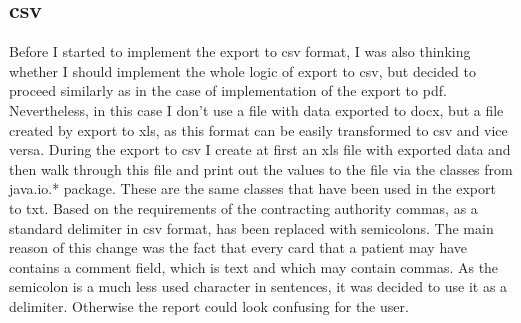 \documentclass[thesis=B,english]{FITthesis}[2012/10/20]
\begin{document}
\subsection{csv}
Before I started to implement the export to csv format, I was also thinking whether I should implement the whole logic of export to csv, but decided to proceed similarly as in the case of implementation of the export to pdf. Nevertheless, in this case I don't use a file with data exported to docx, but a file created by export to xls, as this format can be easily transformed to csv and vice versa. During the export to csv I create at first an xls file with exported data and then walk through this file and print out the values to the file via the classes from java.io.* package. These are the same classes that have been used in the export to txt. Based on the requirements of the contracting authority commas, as a standard delimiter in csv format, has been replaced with semicolons. The main reason of this change was the fact that every card that a patient may have contains a comment field, which is  text and which may contain commas. As the semicolon is a much less used character in sentences, it was decided to use it as a delimiter. Otherwise the report could look confusing for the user.
\end{document}
